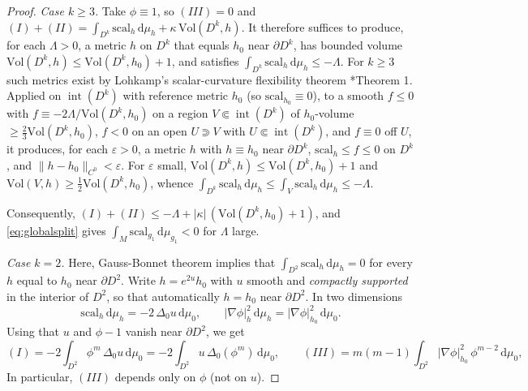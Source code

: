 \documentclass[12pt,a4paper]{amsart}
\theoremstyle{plain}
\theoremstyle{definition}
\theoremstyle{remark}
\newcommand{\ga}{\mathit{g}} %
\begin{document}
\begin{proof}
\emph{Case $k\ge 3$.} Take $\phi\equiv 1$, so $(III)=0$ and
$(I)+(II)=\int_{D^k}\mathrm{scal}_h\,\mathrm{d}\mu_h+\kappa\,\mathrm{Vol}(D^k,h)$. It therefore
suffices to produce, for each $\Lambda>0$, a metric $h$ on $D^k$ that equals $h_0$ near
$\partial D^k$, has bounded volume $\mathrm{Vol}(D^k,h)\le \mathrm{Vol}(D^k,h_0)+1$, and satisfies
$\int_{D^k}\mathrm{scal}_h\,\mathrm{d}\mu_h\le-\Lambda$. For $k\ge 3$ such metrics exist by Lohkamp's scalar-curvature flexibility theorem
\cite{Lohkamp1999}*{Theorem 1}. Applied on $\operatorname{int}(D^k)$ with reference
metric $h_0$ (so $\mathrm{scal}_{h_0}\equiv0$), to a smooth $f\le0$ with
$f\equiv-2\Lambda/\mathrm{Vol}(D^k,h_0)$ on a region $V\Subset\operatorname{int}(D^k)$ of
$h_0$-volume $\ge\tfrac23\mathrm{Vol}(D^k,h_0)$, $f<0$ on an open $U\Supset V$ with
$U\Subset\operatorname{int}(D^k)$, and $f\equiv0$ off $U$, it produces, for each $\varepsilon>0$,
a metric $h$ with $h\equiv h_0$ near $\partial D^k$, $\mathrm{scal}_h\le f\le0$ on $D^k$, and
$\|h-h_0\|_{C^0}<\varepsilon$. For $\varepsilon$ small, $\mathrm{Vol}(D^k,h)\le\mathrm{Vol}(D^k,h_0)+1$
and $\mathrm{Vol}(V,h)\ge\tfrac12\mathrm{Vol}(D^k,h_0)$, whence
$\int_{D^k}\mathrm{scal}_h\,\mathrm{d}\mu_h\le\int_V\mathrm{scal}_h\,\mathrm{d}\mu_h\le-\Lambda$.

Consequently, $(I)+(II)\le-\Lambda+|\kappa|\,(\mathrm{Vol}(D^k,h_0)+1)$, and \eqref{eq:globalsplit}
gives $\int_M\mathrm{scal}_{\ga_1}\,\mathrm{d}\mu_{\ga_1}<0$ for $\Lambda$ large.

\emph{Case $k=2$.} Here, Gauss-Bonnet theorem implies that $\int_{D^2}\mathrm{scal}_h\,\mathrm{d}\mu_h=0$ for every $h$ equal to $h_0$
near $\partial D^2$. Write $h=e^{2u}h_0$ with $u$ smooth and \emph{compactly supported} in the interior of
$D^2$, so that automatically $h=h_0$ near $\partial D^2$. In two dimensions
\[
\mathrm{scal}_h\,\mathrm{d}\mu_h=-2\,\Delta_0 u\,\mathrm{d}\mu_0,\qquad
|\nabla\phi|_h^2\,\mathrm{d}\mu_h=|\nabla\phi|_{h_0}^2\,\mathrm{d}\mu_0.
\]
Using that $u$ and $\phi-1$ vanish near
$\partial D^2$, we get
\[
(I)=-2\!\int_{D^2}\!\phi^m\,\Delta_0 u\,\mathrm{d}\mu_0
   =-2\!\int_{D^2}\! u\,\Delta_0(\phi^m)\,\mathrm{d}\mu_0,\qquad
(III)=m(m-1)\!\int_{D^2}\!|\nabla\phi|_{h_0}^2\,\phi^{m-2}\,\mathrm{d}\mu_0,
\]
In particular, $(III)$ depends only on $\phi$ (not on $u$).


\end{proof}
\end{document}
